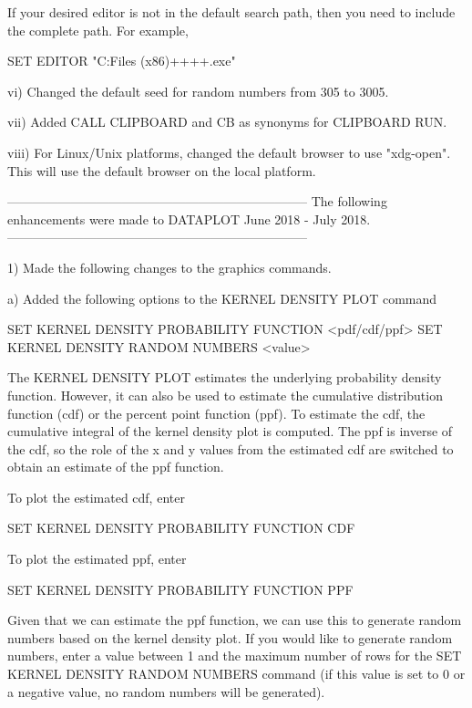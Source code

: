          If your desired editor is not in the default search path, then
         you need to include the complete path.  For example,

             SET EDITOR "C:\Program Files (x86)\notepad++\notepad++.exe"

     vi) Changed the default seed for random numbers from 305 to 3005.

    vii) Added CALL CLIPBOARD and CB as synonyms for CLIPBOARD RUN.

   viii) For Linux/Unix platforms, changed the default browser to use
         "xdg-open".  This will use the default browser on the local
         platform.

-----------------------------------------------------------------------
The following enhancements were made to DATAPLOT
June 2018 - July 2018.
-----------------------------------------------------------------------

 1) Made the following changes to the graphics commands.

    a) Added the following options to the KERNEL DENSITY PLOT command

          SET KERNEL DENSITY PROBABILITY FUNCTION <pdf/cdf/ppf>
          SET KERNEL DENSITY RANDOM NUMBERS <value>

       The KERNEL DENSITY PLOT estimates the underlying probability
       density function.  However, it can also be used to estimate
       the cumulative distribution function (cdf) or the percent point
       function (ppf).  To estimate the cdf, the cumulative integral of
       the kernel density plot is computed.  The ppf is inverse of the
       cdf, so the role of the x and y values from the estimated cdf are
       switched to obtain an estimate of the ppf function.

       To plot the estimated cdf, enter
 
          SET KERNEL DENSITY PROBABILITY FUNCTION CDF

       To plot the estimated ppf, enter
 
          SET KERNEL DENSITY PROBABILITY FUNCTION PPF

    Given that we can estimate the ppf function, we can use this to
    generate random numbers based on the kernel density plot.  If you
    would like to generate random numbers, enter a value between 1 and
    the maximum number of rows for the SET KERNEL DENSITY RANDOM NUMBERS
    command (if this value is set to 0 or a negative value, no random
    numbers will be generated).

